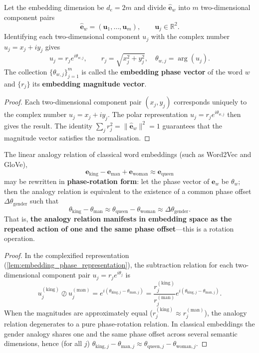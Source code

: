\begin{lemma}\label{lem:embedding_phase_representation}
Let the embedding dimension be $d_e=2m$ and divide $\widehat{\mathbf{e}}_w$ into $m$ two-dimensional component pairs
\[
\widehat{\mathbf{e}}_w=(\mathbf{u}_1,\dots,\mathbf{u}_m),\qquad \mathbf{u}_j\in\mathbb{R}^2.
\]
Identifying each two-dimensional component $u_j$ with the complex number $u_j=x_j+iy_j$ gives
\[
u_j=r_je^{i\theta_{w,j}},\qquad
r_j=\sqrt{x_j^2+y_j^2},\quad \theta_{w,j}=\arg(u_j).
\]
The collection $\{\theta_{w,j}\}_{j=1}^m$ is called the \textbf{embedding phase vector} of the word $w$ and $\{r_j\}$ its \textbf{embedding magnitude vector}.
\end{lemma}

\begin{proof}
Each two-dimensional component pair $(x_j,y_j)$ corresponds uniquely to the complex number $u_j=x_j+iy_j$. The polar representation $u_j=r_je^{i\theta_{w,j}}$ then gives the result. The identity $\sum_jr_j^2=\|\widehat{\mathbf{e}}_w\|^2=1$ guarantees that the magnitude vector satisfies the normalisation.
\end{proof}

\begin{proposition}\label{prop:embedding_rotation_analogy}
The linear analogy relation of classical word embeddings (such as Word2Vec and GloVe),
\[
\mathbf{e}_{\text{king}}-\mathbf{e}_{\text{man}}+\mathbf{e}_{\text{woman}}\approx\mathbf{e}_{\text{queen}}
\]
may be rewritten in \textbf{phase-rotation form}: let the phase vector of $\mathbf{e}_w$ be $\theta_w$; then the analogy relation is equivalent to the existence of a common phase offset $\Delta\theta_{\text{gender}}$ such that
\[
\theta_{\text{king}}-\theta_{\text{man}}\approx\theta_{\text{queen}}-\theta_{\text{woman}}\approx\Delta\theta_{\text{gender}}.
\]
That is, \textbf{the analogy relation manifests in embedding space as the repeated action of one and the same phase offset}---this is a rotation operation.
\end{proposition}

\begin{proof}
In the complexified representation (\cref{lem:embedding_phase_representation}), the subtraction relation for each two-dimensional component pair $u_j=r_je^{i\theta_j}$ is
\[
u_j^{(\text{king})}\oslash u_j^{(\text{man})}=e^{i(\theta_{\text{king},j}-\theta_{\text{man},j})}=\frac{r_j^{(\text{king})}}{r_j^{(\text{man})}}e^{i(\theta_{\text{king},j}-\theta_{\text{man},j})}.
\]
When the magnitudes are approximately equal ($r_j^{(\text{king})}\approx r_j^{(\text{man})}$), the analogy relation degenerates to a pure phase-rotation relation. In classical embeddings the gender analogy shares one and the same phase offset across several semantic dimensions, hence (for all $j$) $\theta_{\text{king},j}-\theta_{\text{man},j}\approx\theta_{\text{queen},j}-\theta_{\text{woman},j}$.
\end{proof}


